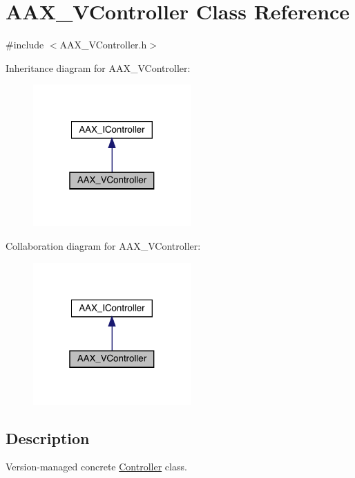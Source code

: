 \hypertarget{a01905}{}\section{A\+A\+X\+\_\+\+V\+Controller Class Reference}
\label{a01905}


{\ttfamily \#include $<$A\+A\+X\+\_\+\+V\+Controller.\+h$>$}



Inheritance diagram for A\+A\+X\+\_\+\+V\+Controller\+:
\nopagebreak
\begin{figure}[H]
\begin{center}
\leavevmode
\includegraphics[width=172pt]{a01904}
\end{center}
\end{figure}


Collaboration diagram for A\+A\+X\+\_\+\+V\+Controller\+:
\nopagebreak
\begin{figure}[H]
\begin{center}
\leavevmode
\includegraphics[width=172pt]{a01903}
\end{center}
\end{figure}


\subsection{Description}
Version-\/managed concrete \mbox{\hyperlink{a01789}{Controller}} class. 

